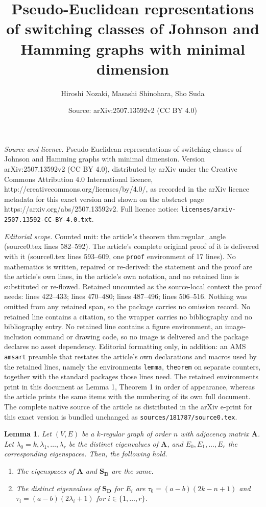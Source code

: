 \documentclass[10pt,a4paper]{amsart}
\title{Pseudo-Euclidean representations of switching classes of Johnson and Hamming graphs with minimal dimension}
\author{Hiroshi Nozaki, Masashi Shinohara, Sho Suda}
\date{Source: arXiv:2507.13592v2 (CC BY 4.0)}
\newtheorem{lemma}{Lemma}
\newcommand{\A}{\boldsymbol{A}}
\newcommand{\D}{\boldsymbol{D}}
\newcommand{\Sm}{\boldsymbol{S}}
\begin{document}
\maketitle

\noindent\emph{Source and licence.} Pseudo-Euclidean representations of switching classes of Johnson and Hamming graphs with minimal dimension. Version arXiv:2507.13592v2 (CC BY 4.0), distributed by arXiv under the Creative Commons Attribution 4.0 International licence, http://creativecommons.org/licenses/by/4.0/, as recorded in the arXiv licence metadata for this exact version and shown on the abstract page https://arxiv.org/abs/2507.13592v2. Full licence notice: \texttt{licenses/arxiv-2507.13592-CC-BY-4.0.txt}.\par\smallskip

\noindent\textit{Editorial scope.} Counted unit: the article's theorem thm:regular\_angle (source0.tex lines 582--592). The article's complete original proof of it is delivered with it (source0.tex lines 593--609, one \texttt{proof} environment of 17 lines). No mathematics is written, repaired or re-derived: the statement and the proof are the article's own lines, in the article's own notation, and no retained line is substituted or re-flowed.  Retained uncounted as the source-local context the proof needs: lines 422--433; lines 470--480; lines 487--496; lines 506--516.  Nothing was omitted from any retained span, so the package carries no omission record.  No retained line contains a citation, so the wrapper carries no bibliography and no bibliography entry.  No retained line contains a figure environment, an image-inclusion command or drawing code, so no image is delivered and the package declares no asset dependency.  Editorial formatting only, in addition: an AMS \texttt{amsart} preamble that restates the article's own declarations and macros used by the retained lines, namely the environments \texttt{lemma}, \texttt{theorem} on separate counters, together with the standard packages those lines need.  The retained environments print in this document as Lemma 1, Theorem 1 in order of appearance, whereas the article prints the same items with the numbering of its own full document.  The complete native source of the article as distributed in the arXiv e-print for this exact version is bundled unchanged as \texttt{sources/181787/source0.tex}.
\begin{lemma} \label{lem:eigen_SD}
Let $(V,E)$ be a $k$-regular graph of order $n$ with adjacency matrix $\A$. 
 Let $\lambda_0=k,\lambda_1,\ldots,\lambda_r$ be the distinct eigenvalues of $\A$, and  $E_0,E_1,\ldots,E_r$ the corresponding eigenspaces.  
Then, the following hold. 
\begin{enumerate}
\item The eigenspaces of $\A$ 
and $\Sm_{\D}$ are the same. 
\item The distinct eigenvalues of $\Sm_{\D}$ for $E_i$ are 
$\tau_0=(a-b)(2k-n+1)$ and $\tau_i=(a-b)(2\lambda_i+1)$ for $i\in\{1,\ldots,r\}$. 
\end{enumerate}
\end{lemma}
\end{document}
